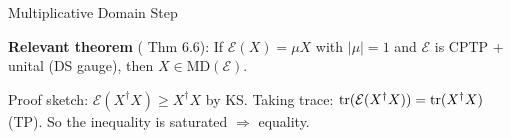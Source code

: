 \documentclass[aspectratio=169,10pt]{beamer}
\begin{document}
\begin{frame}{Multiplicative Domain Step}
\begin{center}
    \end{center}

    \vspace{0.1em}
    {\small\textbf{Relevant theorem} (\cite{Wolf2012Quantum} Thm 6.6):
    If $\mathcal{E}(X) = \mu X$ with $|\mu| = 1$ and $\mathcal{E}$ is CPTP + unital (DS gauge),
    then $X \in \mathrm{MD}(\mathcal{E})$.}

    \vspace{0.1em}
    {\footnotesize Proof sketch: $\mathcal{E}(X^\dagger X) \geq X^\dagger X$ by KS.
    Taking trace: $\mathrm{tr}(\mathcal{E}(X^\dagger X)) = \mathrm{tr}(X^\dagger X)$ (TP).
    So the inequality is saturated $\Rightarrow$ equality.}
\end{frame}
\end{document}
